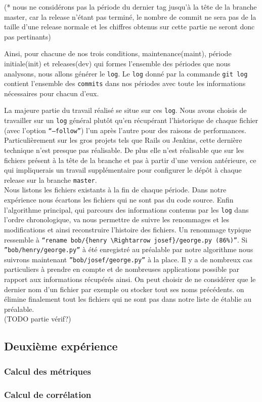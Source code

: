 (* nous ne considérons pas la période du dernier tag jusqu'à la tête de la branche master, car la release n'étant pas terminé, le nombre de commit ne sera pas de la taille d'une release normale et les chiffres obtenus sur cette partie ne seront donc pas pertinants)

Ainsi, pour chacune de nos trois conditions, maintenance(maint), période initiale(init) et releases(dev) qui formes l'ensemble des périodes que nous analysons, nous allons générer le \texttt{log}. Le \texttt{log} donné par la commande \texttt{git log} contient l'ensemble des \texttt{commits} dans nos périodes avec toute les informations nécessaires pour chacun d'eux.

La majeure partie du travail réalisé se situe sur ces \texttt{log}. Nous avons choisis de travailler sur un \texttt{log} général plutôt qu'en récupérant l'historique de chaque fichier (avec l'option \texttt{``--follow''}) l'un après l'autre pour des raisons de performances. Particulièrement sur les gros projets tels que Rails ou Jenkins, cette dernière technique n'est presque pas réalisable. De plus elle n'est réalisable que sur les fichiers présent à la tête de la branche et pas à partir d'une version antérieure, ce qui impliquerais un travail supplémentaire pour configurer le dépôt à chaque release sur la branche \texttt{master}.\\

Nous listons les fichiers existants à la fin de chaque période. Dans notre expérience nous écartons les fichiers qui ne sont pas du code source. 
Enfin l'algorithme principal, qui parcours des informations contenus par les \texttt{log} dans l'ordre chronologique, va nous permettre de suivre les renommages et les modifications et ainsi reconstruire l'histoire des fichiers. Un renommage typique ressemble à \texttt{``rename bob/\{henry $\Rightarrow$ josef\}/george.py (86\%)''}. Si \texttt{''bob/henry/george.py''} à été enregistré au préalable par notre algorithme nous suivrons maintenant \texttt{''bob/josef/george.py''} à la place. Il y a de nombreux cas particuliers à prendre en compte et de nombreuses applications possible par rapport aux informations récupérés ainsi. On peut choisir de ne considérer que le dernier nom d'un fichier par exemple ou stocker tout ses noms précédents. on élimine finalement tout les fichiers qui ne sont pas dans notre liste de établie au préalable.\\

(TODO partie vérif?)\\

\subsection{Deuxième expérience}

\subsubsection{Calcul des métriques}



\subsubsection{Calcul de corrélation}


